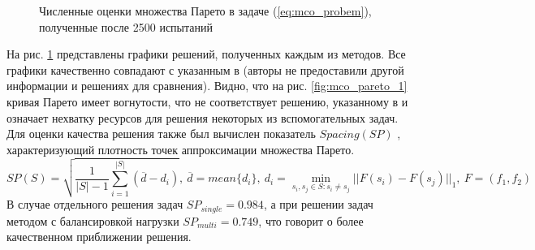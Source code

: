 \documentclass[11pt, oneside, a4paper]{article}
\begin{document}
\begin{figure}[ht]
    \centering
    \caption{Численные оценки множества Парето в задаче (\ref{eq:mco_probem}), полученные после 2500 испытаний}
    \label{fig:mco_pareto}
\end{figure}

На рис. \ref{fig:mco_pareto} представлены графики решений, полученных каждым из методов.
Все графики качественно совпадают с указанным в \cite{BinhKorn1999} (авторы не предоставили другой
информации и решениях для сравнения). Видно, что на рис. \ref{fig:mco_pareto_1}
кривая Парето имеет вогнутости, что не соответствует решению, указанному в \cite{BinhKorn1999} и
означает нехватку ресурсов для решения некоторых из вспомогательных задач.
Для оценки качества решения также был вычислен показатель \(Spacing(SP)\) \cite{RiquelmeLucken2015},
характеризующий плотность точек аппроксимации множества Парето.
\begin{displaymath}
  SP(S)=\sqrt{\frac{1}{|S|-1} \sum_{i=1}^{|S|} (\overline{d}-d_i)},
  \:\overline{d}=mean\{d_i\},\:d_i=\min_{s_i,s_j\in S:s_i\ne s_j}||F(s_i)-F(s_j)||_1,\: F=(f_1,f_2)
\end{displaymath}
В случае отдельного решения задач \(SP_{single}=0.984\), а при решении задач методом с балансировкой нагрузки
\(SP_{multi}=0.749\), что говорит о более качественном приближении решения.
\end{document}
